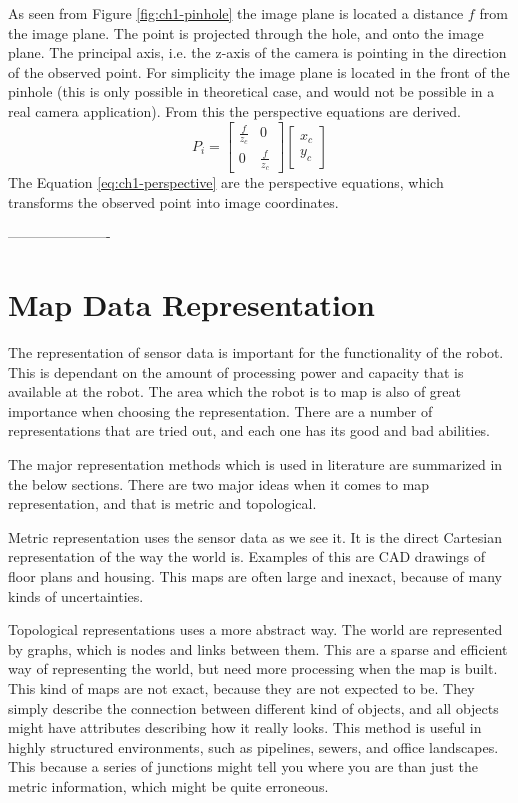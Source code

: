 	As seen from Figure \ref{fig:ch1-pinhole} the image plane is located a distance $f$ from the image plane. 
	The point is projected through the hole, and onto the image plane. The principal axis, i.e. the z-axis of the
	camera is pointing
	in the direction of the observed point. For simplicity the image plane is located in the front of the
	pinhole (this is only possible in theoretical case, and would not be possible in a real camera application).
    From this the perspective equations are derived. \cite{robotbok}
	\begin{equation}
		\label{eq:ch1-perspective}
		P_i = \left[ \begin{array}{cc}
					\frac{f}{z_c} & 0 \\
					0	& \frac{f}{z_c} 
				\end{array} \right] 
				\left[ \begin{array}{c}
					x_c \\
					y_c
					\end{array} \right]
	\end{equation}
	The Equation \eqref{eq:ch1-perspective} are the perspective equations, which transforms the observed 
	point into image coordinates. 

----------------------




\section{Map Data Representation}
The representation of sensor data is important for the functionality of the robot. This is
dependant on the amount of processing power and capacity that is available at the robot.
The area which the robot is to map is also of great importance when choosing the
representation. There are a number of representations that are tried out, and each one has its good and
bad abilities. 

The major representation methods which is used in literature are summarized in the below
sections. There are two major ideas when it comes to map representation, and that is
metric and topological.

Metric representation uses the sensor data as we see it. It is the direct Cartesian
representation of the way the world is. Examples of this are CAD drawings of floor plans
and housing. This maps are often large and inexact, because of many kinds of
uncertainties.

Topological representations uses a more abstract way. The world are represented by graphs,
which is nodes and links between them. This are a sparse and efficient way of representing
the world, but need more processing when the map is built. This kind of maps are not
exact, because they are not expected to be. They simply describe the connection between
different kind of objects, and all objects might have attributes describing how it really
looks. This method is useful in highly structured environments, such as pipelines, sewers,
and office landscapes. This because a series of junctions might tell you where you are
than just the metric information, which might be quite erroneous. 


